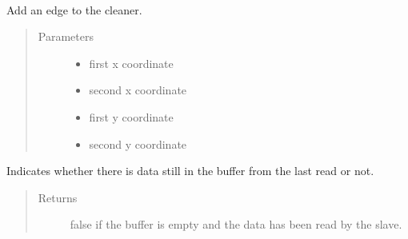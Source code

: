\documentclass[a4paper,10pt,english]{sphinxmanual}
\begin{document}
\begin{fulllineitems}
\label{\detokenize{drc/drc:kppc.drc.PyCleanerMaster}}~

\begin{fulllineitems}
\label{\detokenize{drc/drc:kppc.drc.PyCleanerMaster.add_edge}}
Add an edge to the cleaner.
\begin{quote}\begin{description}
\item[{Parameters}] \leavevmode\begin{itemize}
\item {} 
 \textendash{} first x coordinate

\item {} 
 \textendash{} second x coordinate

\item {} 
 \textendash{} first y coordinate

\item {} 
 \textendash{} second y coordinate

\end{itemize}

\end{description}\end{quote}

\end{fulllineitems}


\begin{fulllineitems}
\label{\detokenize{drc/drc:kppc.drc.PyCleanerMaster.done}}
Indicates whether there is data still in the buffer from the last read or not.
\begin{quote}\begin{description}
\item[{Returns}] \leavevmode
false if the buffer is empty and the data has been read by the slave.


\end{description}
\end{quote}
\end{fulllineitems}
\end{fulllineitems}
\end{document}
